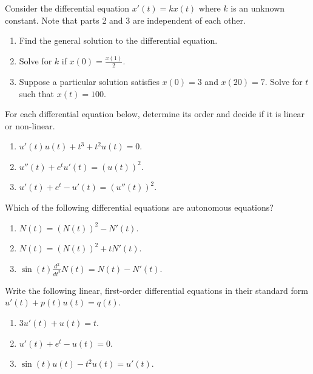 \documentclass[../main.tex]{subfiles}
\begin{document}
\begin{exercise}
  Consider the differential equation \(x'(t) = k x(t)\) where \(k\) is an unknown constant. Note that parts 2 and 3 are independent of each other.
  \begin{enumerate}
    \item Find the general solution to the differential equation.
    \item Solve for \(k\) if \(x(0) = \frac{x(1)}{2}\). 
    \item Suppose a particular solution satisfies \(x(0) = 3\) and \(x(20) = 7\).  Solve for \(t\) such that \(x(t) = 100\).
  \end{enumerate}

\end{exercise}

\begin{exercise}
  For each differential equation below, determine its order and decide if it is linear or non-linear.

  \begin{enumerate}
    \item \(u'(t)u(t) + t^{3} + t^{2}u(t) = 0\).
    \item \(u''(t) + e^{t}u'(t) = (u(t))^{2}\).
    \item \(u'(t) + e^{t} - u'(t) = (u''(t))^{2}\).
  \end{enumerate}
\end{exercise}

\begin{exercise}
  Which of the following differential equations are autonomous equations?

  \begin{enumerate}
    \item \(N(t) = (N(t))^{2} - N'(t)\).
    \item \(N(t) = (N(t))^{2} + tN'(t)\).
    \item \(\sin(t) \frac{d^{2}}{dt^{2}}N(t) = N(t) - N'(t)\).
  \end{enumerate}
\end{exercise}

\begin{exercise}
  Write the following linear, first-order differential equations in their standard form \(u'(t) + p(t) u(t) = q(t)\).

  \begin{enumerate}
    \item \(3u'(t) + u(t) = t\).
    \item \(u'(t) + e^{t} - u(t) = 0\).
    \item \(\sin(t) u(t) - t^{2} u(t) = u'(t)\).
  \end{enumerate}
\end{exercise}
\end{document}
